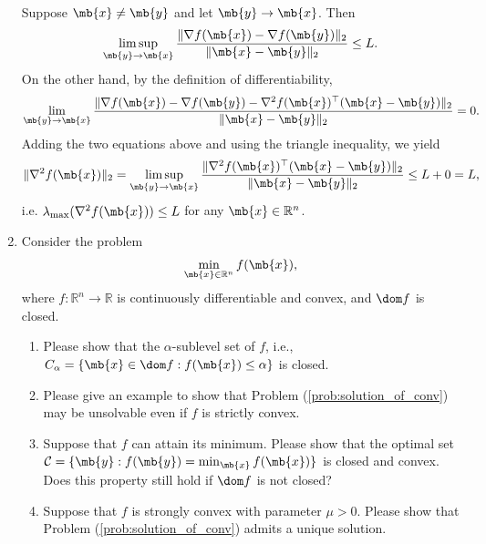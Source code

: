 \begin{exercise}
\begin{enumerate}
      \begin{solution}
        Suppose $\mb{x}\neq \mb{y}$ and let $\mb{y}\to \mb{x}$. Then
        $$
          \limsup_{\mb{y}\to \mb{x}}\frac{\|\nabla f(\mb{x})-\nabla f(\mb{y})\|_2}{\|\mb{x}-\mb{y}\|_2}\le L.
        $$
        On the other hand, by the definition of differentiability,
        $$
          \lim_{\mb{y}\to \mb{x}}\frac{\|\nabla f(\mb{x})-\nabla f(\mb{y}) - \nabla^2 f(\mb{x})^\top(\mb{x}-\mb{y})\|_2}{\|\mb{x}-\mb{y}\|_2} = 0.
        $$
        Adding the two equations above and using the triangle inequality, we yield
        $$
          \|\nabla^2 f(\mb{x})\|_2 = \limsup_{\mb{y}\to \mb{x}}\frac{\|\nabla^2 f(\mb{x})^\top(\mb{x}-\mb{y})\|_2}{\|\mb{x}-\mb{y}\|_2} \le L + 0 = L,
        $$
        i.e. $\lambda_{\max}(\nabla^2f(\mb{x}))\le L$ for any $\mb{x}\in\mathbb{R}^n$.
        \qedhere
      \end{solution}
      
    \item Consider the problem
      \begin{align}\label{prob:solution_of_conv}
        \min_{\mb{x}\in\mathbb{R}^n}f(\mb{x}),
      \end{align}
      where $f:\mathbb{R}^n\rightarrow\mathbb{R}$ is  continuously differentiable and convex, and $\dom  f$ is closed.
      \begin{enumerate}
        \item
          Please show that the $\alpha$-sublevel set of $f$, i.e., $ C_\alpha=\{\mb{x}\in\dom f:f(\mb{x})\leq \alpha\}
          $
          is closed.
        \item
          Please give an example to show that Problem (\ref{prob:solution_of_conv}) may be unsolvable even if $f$ is strictly convex.
        \item
          Suppose that $f$ can attain its minimum. Please show that the optimal set $\mathcal{C}=\{ \mb{y}:f(\mb{y})=\min_{\mb{x}} f(\mb{x})\}$ is closed and convex. Does this property still hold if $\dom f$ is not closed?
        \item
          Suppose that $f$ is strongly convex with parameter $\mu>0$. Please show that Problem (\ref{prob:solution_of_conv}) admits a unique solution.
      \end{enumerate}
      

\end{enumerate}
\end{exercise}
